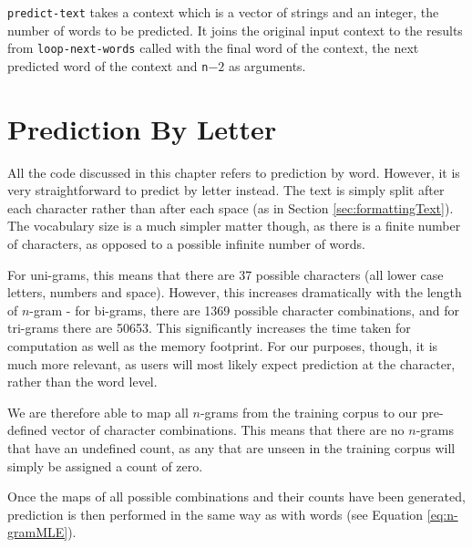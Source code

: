 \lstinline!predict-text! takes a context which is a vector of strings and an integer, the number of words to be predicted. It joins the original input context to the results from \lstinline!loop-next-words! called with the final word of the context, the next predicted word of the context and \lstinline!n!$-2$ as arguments.

\section{Prediction By Letter}

All the code discussed in this chapter refers to prediction by word. However, it is very straightforward to predict by letter instead. The text is simply split after each character rather than after each space (as in Section \ref{sec:formattingText}). The vocabulary size is a much simpler matter though, as there is a finite number of characters, as opposed to a possible infinite number of words.

For uni-grams, this means that there are 37 possible characters (all lower case letters, numbers and space). However, this increases dramatically with the length of $n$-gram - for bi-grams, there are 1369 possible character combinations, and for tri-grams there are 50653. This significantly increases the time taken for computation as well as the memory footprint. For our purposes, though, it is much more relevant, as users will most likely expect prediction at the character, rather than the word level.

We are therefore able to map all $n$-grams from the training corpus to our pre-defined vector of character combinations. This means that there are no $n$-grams that have an undefined count, as any that are unseen in the training corpus will simply be assigned a count of zero.

Once the maps of all possible combinations and their counts have been generated, prediction is then performed in the same way as with words (see Equation \ref{eq:n-gramMLE}).
